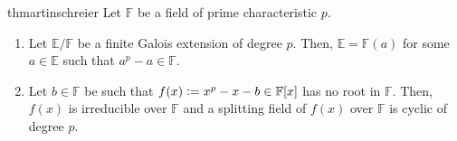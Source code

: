 \begin{restatable}{thm}{artinschreier}
\label{thm:artinschreier}
    Let $\mathbb{F}$ be a field of prime characteristic $p.$
    \begin{enumerate}
        \item Let $\mathbb{E}/\mathbb{F}$ be a finite Galois extension of degree $p.$ Then, $\mathbb{E} = \mathbb{F}(a)$ for some $a \in \mathbb{E}$ such that $a^p - a \in \mathbb{F}.$
        \item Let $b \in \mathbb{F}$ be such that $f(x) \vcentcolon= x^p - x - b \in \mathbb{F}[x]$ has no root in $\mathbb{F}.$ Then, $f(x)$ is irreducible over $\mathbb{F}$ and a splitting field of $f(x)$ over $\mathbb{F}$ is cyclic of degree $p.$ \hfill\hyperref[thm:artinschreier2]{\downsym}
    \end{enumerate} 
\end{restatable}